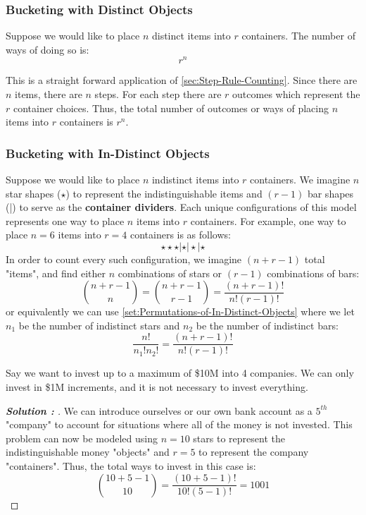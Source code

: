 \documentclass[11pt]{article}
\newenvironment{solution}[1][]{%
  \renewcommand\qedsymbol{$\blacksquare$}%
  \def\temp{\normalfont\bfseries Solution \theexample: #1}
  \begin{proof}[\temp]
  \normalfont %
}{%
  \end{proof}
}
\newcommand{\BF}{\textbf}
\begin{document}
\subsubsection*{Bucketing with Distinct Objects}
\begin{definition}
  Suppose we would like to place $n$ distinct items into $r$ containers. The number of ways of doing so is:
  $$r^{n}$$
\end{definition}
This is a straight forward application of \ref{sec:Step-Rule-Counting}. Since there are $n$ items, there are $n$ steps. For each step there are $r$ outcomes
which represent the $r$ container choices. Thus, the total number of outcomes or ways of placing $n$ items into $r$ containers is $r^{n}$.

\newpage

\subsubsection*{Bucketing with In-Distinct Objects}
\begin{definition}
  Suppose we would like to place $n$ indistinct items into $r$ containers. We imagine $n$ star shapes ($\star$) to represent the indistinguishable items and
  $(r-1)$ bar shapes (|) to serve as the \BF{container dividers}. Each unique configurations of this model represents one way to place $n$ items
  into $r$ containers. For example, one way to place $n=6$ items into $r=4$ containers is as follows:
  \[
    \star \star \star | \star | \star | \star
  \]
  In order to count every such configuration, we imagine $(n+r-1)$ total "items", and find either $n$ combinations of stars or $(r-1)$ combinations of bars:
  \[
    \binom{n+r-1}{n} = \binom{n+r-1}{r-1} = \frac{(n+r-1)!}{n!(r-1)!}
  \]
  or equivalently we can use \ref{set:Permutations-of-In-Distinct-Objects} where we let $n_{1}$ be the number of indistinct stars and $n_{2}$ be the number of
  indistinct bars:
  \[
    \frac{n!}{n_{1}!n_{2}!} = \frac{(n+r-1)!}{n!(r-1)!}
  \]
\end{definition}
\begin{example}
  Say we want to invest up to a maximum of \$10M into 4 companies. We can only invest in \$1M increments, and it is not necessary to invest everything.
\end{example}
\begin{solution}
  We can introduce ourselves or our own bank account as a $5^{th}$ "company" to account for situations where all of the money is not invested. This problem
  can now be modeled using $n=10$ stars to represent the indistinguishable money "objects" and $r = 5$ to represent the company "containers". Thus, the
  total ways to invest in this case is:
  \[
    \binom{10+5-1}{10} = \frac{(10+5-1)!}{10!(5-1)!} = 1001
  \]
\end{solution}
\end{document}
